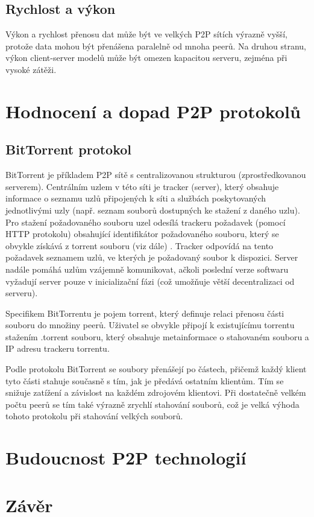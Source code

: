 \documentclass[10pt,twoside,czech,a4paper]{article}
\begin{document}
\subsection{Rychlost a výkon}

Výkon a rychlost přenosu dat může být ve velkých P2P sítích výrazně vyšší, protože data mohou být přenášena paralelně od mnoha peerů.
Na druhou stranu, výkon client-server modelů může být omezen kapacitou serveru, zejména při vysoké zátěži.


\section{Hodnocení a dopad P2P protokolů}

\subsection{BitTorrent protokol}

BitTorrent je příkladem P2P sítě s centralizovanou strukturou (zprostředkovanou serverem).
Centrálním uzlem v této síti je tracker (server), který obsahuje informace o seznamu uzlů připojených k síti a službách poskytovaných jednotlivými uzly (např. seznam souborů dostupných ke stažení z daného uzlu).
Pro stažení požadovaného souboru uzel odesílá trackeru požadavek (pomocí HTTP protokolu) obsahující identifikátor požadovaného souboru, který se obvykle získává z torrent souboru (viz dále) \cite{Chokkalingam2004}.
Tracker odpovídá na tento požadavek seznamem uzlů, ve kterých je požadovaný soubor k dispozici\cite{Radchenko2012}.
Server nadále pomáhá uzlům vzájemně komunikovat, ačkoli poslední verze softwaru vyžadují server pouze v inicializační fázi (což umožňuje větší decentralizaci od serveru)\cite{Lande2008}.

Specifikem BitTorrentu je pojem torrent, který definuje relaci přenosu části souboru do množiny peerů.
Uživatel se obvykle připojí k existujícímu torrentu stažením .torrent souboru, který obsahuje metainformace o stahovaném souboru a IP adresu trackeru torrentu\cite{Legout2005, Chokkalingam2004}.

Podle protokolu BitTorrent se soubory přenášejí po částech, přičemž každý klient tyto části stahuje současně s tím, jak je předává ostatním klientům.
Tím se snižuje zatížení a závislost na každém zdrojovém klientovi\cite{Lande2008}.
Při dostatečně velkém počtu peerů se tím také výrazně zrychlí stahování souborů, což je velká výhoda tohoto protokolu při stahování velkých souborů\cite{Barakat2004}.


\section{Budoucnost P2P technologií}


\section{Závěr}



\end{document}
